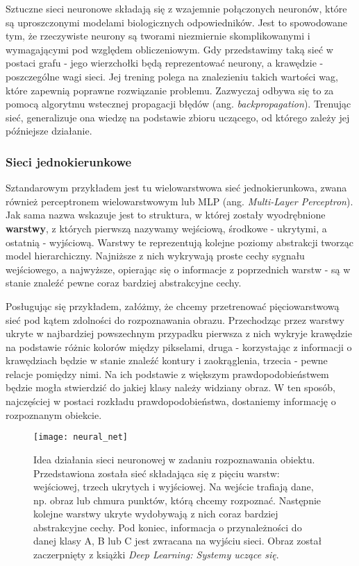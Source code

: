\documentclass{article}
\begin{document}
Sztuczne sieci neuronowe składają się z wzajemnie połączonych neuronów, które są uproszczonymi modelami biologicznych odpowiedników. Jest to spowodowane tym, że rzeczywiste neurony są tworami niezmiernie skomplikowanymi i wymagającymi pod względem obliczeniowym. Gdy przedstawimy taką sieć w postaci grafu - jego wierzchołki będą reprezentować neurony, a krawędzie - poszczególne wagi sieci. Jej trening polega na znalezieniu takich wartości wag, które zapewnią poprawne rozwiązanie problemu. Zazwyczaj odbywa się to za pomocą algorytmu wstecznej propagacji błędów (ang. \emph{backpropagation}). Trenując sieć, generalizuje ona wiedzę na podstawie zbioru uczącego, od którego zależy jej późniejsze działanie.

\subsubsection*{\Large{Sieci jednokierunkowe}}
Sztandarowym przykładem jest tu wielowarstwowa sieć jednokierunkowa, zwana również perceptronem wielowarstwowym lub MLP (ang. \emph{Multi-Layer Perceptron}). Jak sama nazwa wskazuje jest to struktura, w której zostały wyodrębnione \textbf{warstwy}, z których pierwszą nazywamy wejściową, środkowe - ukrytymi, a ostatnią - wyjściową. Warstwy te reprezentują kolejne poziomy abstrakcji tworząc model hierarchiczny. Najniższe z nich wykrywają proste cechy sygnału wejściowego, a najwyższe, opierając się o informacje z poprzednich warstw - są w stanie znaleźć pewne coraz bardziej abstrakcyjne cechy. 

Posługując się przykładem, załóżmy, że chcemy przetrenować pięciowarstwową sieć pod kątem zdolności do rozpoznawania obrazu. Przechodząc przez warstwy ukryte w najbardziej powszechnym przypadku pierwsza z nich wykryje krawędzie na podstawie różnic kolorów między pikselami, druga - korzystając z informacji o krawędziach będzie w stanie znaleźć kontury i zaokrąglenia, trzecia - pewne relacje pomiędzy nimi. Na ich podstawie z większym prawdopodobieństwem będzie mogła stwierdzić do jakiej klasy należy widziany obraz. W ten sposób, najczęściej w postaci rozkładu prawdopodobieństwa, dostaniemy informację o rozpoznanym obiekcie.

\begin{figure}[h!]
\centering
\texttt{[image: neural\_net]}
\caption{Idea działania sieci neuronowej w zadaniu rozpoznawania obiektu. Przedstawiona została sieć składająca się z pięciu warstw: wejściowej, trzech ukrytych i wyjściowej. Na wejście trafiają dane, np. obraz lub chmura punktów, którą chcemy rozpoznać. Następnie kolejne warstwy ukryte wydobywają z nich coraz bardziej abstrakcyjne cechy. Pod koniec, informacja o przynależności do danej klasy A, B lub C jest zwracana na wyjściu sieci. Obraz został zaczerpnięty z książki \emph{Deep Learning: Systemy uczące się}.}
\end{figure}
\end{document}
